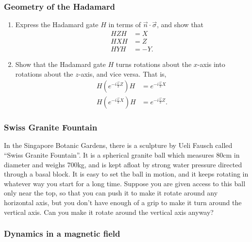 \documentclass[fleqn,a4paper]{article}
\theoremstyle{definition}
\theoremstyle{definition}
\theoremstyle{definition}
\theoremstyle{definition}
\theoremstyle{remark}
\begin{document}
\hypertarget{geometry-of-the-hadamard}{%
\subsubsection{Geometry of the Hadamard}\label{geometry-of-the-hadamard}}

\begin{enumerate}
\def\labelenumi{\arabic{enumi}.}
\item
  Express the Hadamard gate \(H\) in terms of \(\vec{n}\cdot\vec{\sigma}\), and show that
  \[
    \begin{aligned}
   HZH&=X
    \\HXH&=Z
    \\HYH&=-Y.
    \end{aligned}
  \]
\item
  Show that the Hadamard gate \(H\) turns rotations about the \(x\)-axis into rotations about the \(z\)-axis, and vice versa.
  That is,
  \[
   \begin{aligned}
     H \left(
       e^{-i\frac{\varphi}{2}Z}
     \right) H
     &= e^{-i\frac{\varphi}{2}X}
   \\H \left(
       e^{-i\frac{\varphi}{2}X}
     \right) H
     &= e^{-i\frac{\varphi}{2}Z}.
   \end{aligned}
    \]
\end{enumerate}

\hypertarget{swiss-granite-fountain}{%
\subsubsection{Swiss Granite Fountain}\label{swiss-granite-fountain}}

In the Singapore Botanic Gardens, there is a sculpture by Ueli Fausch called ``Swiss Granite Fountain''.
It is a spherical granite ball which measures 80cm in diameter and weighs 700kg, and is kept afloat by strong water pressure directed through a basal block.
It is easy to set the ball in motion, and it keeps rotating in whatever way you start for a long time.
Suppose you are given access to this ball only near the top, so that you can push it to make it rotate around any horizontal axis, but you don't have enough of a grip to make it turn around the vertical axis.
Can you make it rotate around the vertical axis anyway?

\hypertarget{dynamics-in-a-magnetic-field}{%
\subsubsection{Dynamics in a magnetic field}\label{dynamics-in-a-magnetic-field}}
\end{document}
